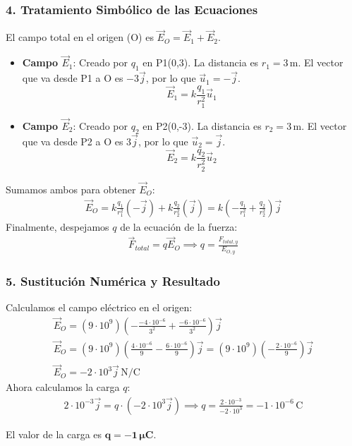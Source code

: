 \subsubsection*{4. Tratamiento Simbólico de las Ecuaciones}
El campo total en el origen (O) es $\vec{E}_O = \vec{E}_1 + \vec{E}_2$.
\begin{itemize}
    \item \textbf{Campo $\vec{E}_1$}: Creado por $q_1$ en P1(0,3). La distancia es $r_1=3\,\text{m}$. El vector que va desde P1 a O es $-3\vec{j}$, por lo que $\vec{u}_1 = -\vec{j}$.
    $$ \vec{E}_1 = k \frac{q_1}{r_1^2} \vec{u}_1 $$
    \item \textbf{Campo $\vec{E}_2$}: Creado por $q_2$ en P2(0,-3). La distancia es $r_2=3\,\text{m}$. El vector que va desde P2 a O es $3\vec{j}$, por lo que $\vec{u}_2 = \vec{j}$.
    $$ \vec{E}_2 = k \frac{q_2}{r_2^2} \vec{u}_2 $$
\end{itemize}
Sumamos ambos para obtener $\vec{E}_O$:
\begin{gather}
    \vec{E}_O = k \frac{q_1}{r_1^2} (-\vec{j}) + k \frac{q_2}{r_2^2} (\vec{j}) = k \left( -\frac{q_1}{r_1^2} + \frac{q_2}{r_2^2} \right) \vec{j}
\end{gather}
Finalmente, despejamos $q$ de la ecuación de la fuerza:
\begin{gather}
    \vec{F}_{total} = q \vec{E}_O \implies q = \frac{F_{total,y}}{E_{O,y}}
\end{gather}

\subsubsection*{5. Sustitución Numérica y Resultado}
Calculamos el campo eléctrico en el origen:
\begin{gather}
    \vec{E}_O = (9\cdot10^9) \left( -\frac{-4\cdot10^{-6}}{3^2} + \frac{-6\cdot10^{-6}}{3^2} \right) \vec{j} \nonumber \\
    \vec{E}_O = (9\cdot10^9) \left( \frac{4\cdot10^{-6}}{9} - \frac{6\cdot10^{-6}}{9} \right) \vec{j} = (9\cdot10^9) \left( -\frac{2\cdot10^{-6}}{9} \right) \vec{j} \nonumber \\
    \vec{E}_O = -2\cdot10^3 \vec{j} \, \text{N/C}
\end{gather}
Ahora calculamos la carga $q$:
\begin{gather}
    2\cdot10^{-3}\vec{j} = q \cdot (-2\cdot10^3 \vec{j}) \implies q = \frac{2\cdot10^{-3}}{-2\cdot10^3} = -1 \cdot 10^{-6} \, \text{C}
\end{gather}
\begin{cajaresultado}
    El valor de la carga es $\boldsymbol{q = -1 \, \mu\textbf{C}}$.
\end{cajaresultado}

